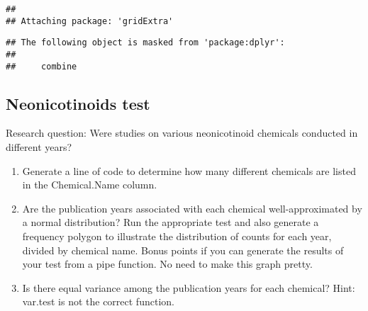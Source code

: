 \documentclass[]{article}
\newenvironment{Shaded}{\begin{snugshade}}{\end{snugshade}}
\newcommand{\KeywordTok}[1]{\textcolor[rgb]{0.13,0.29,0.53}{\textbf{#1}}}
\newcommand{\DataTypeTok}[1]{\textcolor[rgb]{0.13,0.29,0.53}{#1}}
\newcommand{\DecValTok}[1]{\textcolor[rgb]{0.00,0.00,0.81}{#1}}
\newcommand{\StringTok}[1]{\textcolor[rgb]{0.31,0.60,0.02}{#1}}
\newcommand{\CommentTok}[1]{\textcolor[rgb]{0.56,0.35,0.01}{\textit{#1}}}
\newcommand{\OperatorTok}[1]{\textcolor[rgb]{0.81,0.36,0.00}{\textbf{#1}}}
\newcommand{\NormalTok}[1]{#1}
\begin{document}
\begin{verbatim}
## 
## Attaching package: 'gridExtra'
\end{verbatim}

\begin{verbatim}
## The following object is masked from 'package:dplyr':
## 
##     combine
\end{verbatim}

\begin{Shaded}
\end{Shaded}

\subsection{Neonicotinoids test}\label{neonicotinoids-test}

Research question: Were studies on various neonicotinoid chemicals
conducted in different years?

\begin{enumerate}
\def\labelenumi{\arabic{enumi}.}
\setcounter{enumi}{2}
\item
  Generate a line of code to determine how many different chemicals are
  listed in the Chemical.Name column.
\item
  Are the publication years associated with each chemical
  well-approximated by a normal distribution? Run the appropriate test
  and also generate a frequency polygon to illustrate the distribution
  of counts for each year, divided by chemical name. Bonus points if you
  can generate the results of your test from a pipe function. No need to
  make this graph pretty.
\item
  Is there equal variance among the publication years for each chemical?
  Hint: var.test is not the correct function.
\end{enumerate}
\end{document}
